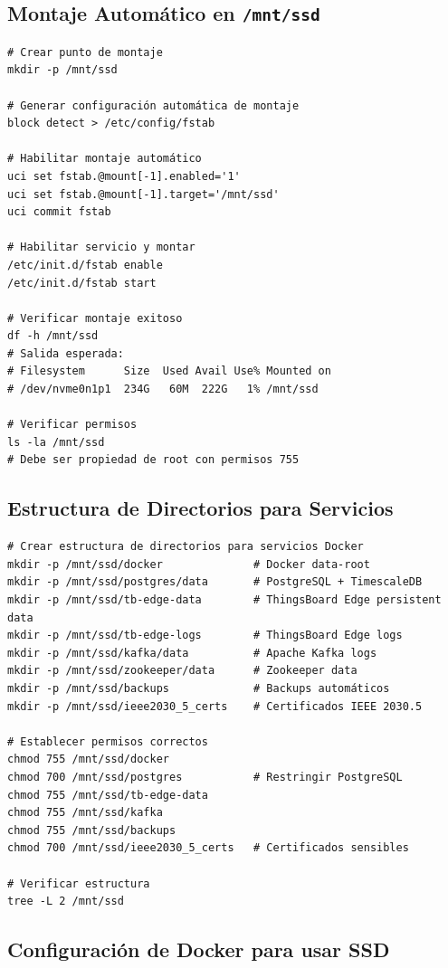 \subsection{Montaje Automático en \texttt{/mnt/ssd}}

\begin{verbatim}
# Crear punto de montaje
mkdir -p /mnt/ssd

# Generar configuración automática de montaje
block detect > /etc/config/fstab

# Habilitar montaje automático
uci set fstab.@mount[-1].enabled='1'
uci set fstab.@mount[-1].target='/mnt/ssd'
uci commit fstab

# Habilitar servicio y montar
/etc/init.d/fstab enable
/etc/init.d/fstab start

# Verificar montaje exitoso
df -h /mnt/ssd
# Salida esperada:
# Filesystem      Size  Used Avail Use% Mounted on
# /dev/nvme0n1p1  234G   60M  222G   1% /mnt/ssd

# Verificar permisos
ls -la /mnt/ssd
# Debe ser propiedad de root con permisos 755
\end{verbatim}

\subsection{Estructura de Directorios para Servicios}

\begin{verbatim}
# Crear estructura de directorios para servicios Docker
mkdir -p /mnt/ssd/docker              # Docker data-root
mkdir -p /mnt/ssd/postgres/data       # PostgreSQL + TimescaleDB
mkdir -p /mnt/ssd/tb-edge-data        # ThingsBoard Edge persistent data
mkdir -p /mnt/ssd/tb-edge-logs        # ThingsBoard Edge logs
mkdir -p /mnt/ssd/kafka/data          # Apache Kafka logs
mkdir -p /mnt/ssd/zookeeper/data      # Zookeeper data
mkdir -p /mnt/ssd/backups             # Backups automáticos
mkdir -p /mnt/ssd/ieee2030_5_certs    # Certificados IEEE 2030.5

# Establecer permisos correctos
chmod 755 /mnt/ssd/docker
chmod 700 /mnt/ssd/postgres           # Restringir PostgreSQL
chmod 755 /mnt/ssd/tb-edge-data
chmod 755 /mnt/ssd/kafka
chmod 755 /mnt/ssd/backups
chmod 700 /mnt/ssd/ieee2030_5_certs   # Certificados sensibles

# Verificar estructura
tree -L 2 /mnt/ssd
\end{verbatim}

\subsection{Configuración de Docker para usar SSD}

